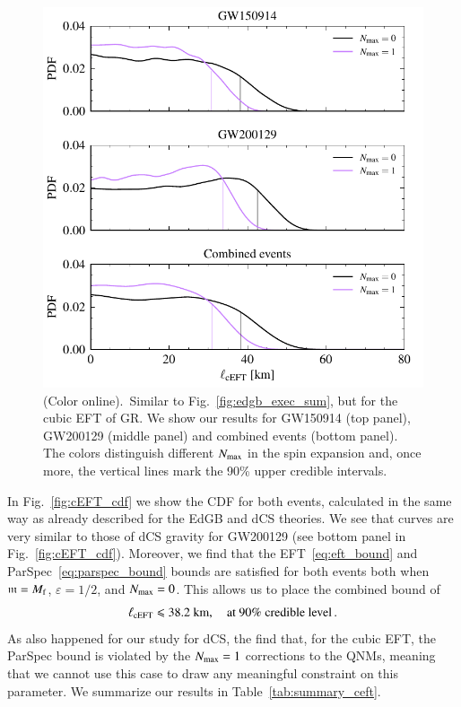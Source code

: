 \documentclass[twocolumn,
               prd,
               aps,
               superscriptaddress,
               tightenlines,
               nofootinbib,
               eqsecnum,
               amsfonts,
               amsmath,
               longbibliography]{revtex4-1}
\begin{document}
\begin{figure}[t]
\includegraphics[width=\columnwidth]{figs/ceft_posteriors_combined.pdf}
\caption{(Color online).~Similar to Fig.~\ref{fig:edgb_exec_sum}, but for the cubic EFT of GR.
We show our results for
GW150914 (top panel), GW200129 (middle panel) and combined events (bottom panel).
%
The colors distinguish different $N_{\rm max}$ in the spin expansion and, once more, the vertical
lines mark the 90\% upper credible intervals.
}
\label{fig:cEFT_exec_sum}
\end{figure}

In Fig.~\ref{fig:cEFT_cdf} we show the CDF for both events, calculated in the
same way as already described for the EdGB and dCS theories.
%
We see that curves are very similar to those of dCS gravity for GW200129 (see
bottom panel in Fig.~\ref{fig:cEFT_cdf}).
%
Moreover, we find that the EFT~\eqref{eq:eft_bound} and
ParSpec~\eqref{eq:parspec_bound} bounds are satisfied for both events both when
$\mathfrak{m} = M_{\rm f}$, $\varepsilon = 1/2$, and $N_{\rm max} = 0$.
%
This allows us to place the combined bound of
%
\begin{equation}
    \ell_{\rm cEFT} \leqslant 38.2~\textrm{km}, \quad \textrm{at 90\% credible level}\,.
\end{equation}
%
As also happened for our study for dCS, the find that, for
the cubic EFT, the ParSpec bound is violated by the $N_{\rm max} = 1$ corrections to
the QNMs, meaning that we cannot use this case to draw any meaningful
constraint on this parameter.
%
We summarize our results in Table~\ref{tab:summary_ceft}.
\end{document}
